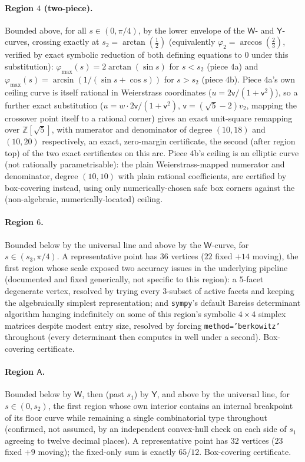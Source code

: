 \documentclass[11pt,reqno]{amsart}
\renewcommand{\_}{\origunderscore\allowbreak}
\numberwithin{equation}{section}
\theoremstyle{plain}
\theoremstyle{definition}
\theoremstyle{remark}
\newcommand{\tilt}{\varphi}                  %
\newcommand{\arcp}{s}                        %
\newcommand{\base}{u}                        %
\begin{document}
\paragraph{Region $4$ (two-piece).}\label{sec:region-4} Bounded above,
for all $\arcp\in(0,\pi/4)$, by the lower envelope of the $\mathsf W$-
and $\mathsf Y$-curves, crossing exactly at
$\arcp_2=\arctan(\tfrac12)$ (equivalently $\tilt_2=\arccos(\tfrac23)$,
verified by exact symbolic reduction of both defining equations to $0$
under this substitution): $\tilt_{\max}(\arcp)=2\arctan(\sin\arcp)$ for
$\arcp<\arcp_2$ (piece $4$a) and
$\tilt_{\max}(\arcp)=\arcsin(1/(\sin\arcp+\cos\arcp))$ for
$\arcp>\arcp_2$ (piece $4$b). Piece $4$a's own ceiling curve is itself
rational in Weierstrass coordinates ($\base=2\mathsf v/(1+\mathsf v^2)$),
so a further exact substitution ($\base=w\cdot2\mathsf v/(1+\mathsf v^2)$,
$\mathsf v=(\sqrt5-2)v_2$, mapping the crossover point itself to a
rational corner) gives an exact unit-square remapping over
$\mathbb{Z}[\sqrt5]$, with numerator and denominator of degree $(10,18)$
and $(10,20)$ respectively, an exact, zero-margin certificate, the
second (after region top) of the two exact certificates on this arc.
Piece $4$b's ceiling is an elliptic curve (not rationally
parametrisable): the plain Weierstrass-mapped numerator and denominator,
degree $(10,10)$ with plain rational coefficients, are certified by
box-covering instead, using only numerically-chosen safe box corners
against the (non-algebraic, numerically-located) ceiling.

\paragraph{Region $6$.} Bounded below by the universal line and above
by the $\mathsf W$-curve, for $\arcp\in(\arcp_3,\pi/4)$. A
representative point has $36$ vertices ($22$ fixed $+14$ moving), the
first region whose scale exposed two accuracy issues in the
underlying pipeline (documented and fixed generically, not specific to
this region): a $5$-facet degenerate vertex, resolved by trying every
$3$-subset of active facets and keeping the algebraically simplest
representation; and \texttt{sympy}'s default Bareiss determinant
algorithm hanging indefinitely on some of this region's symbolic
$4\times4$ simplex matrices despite modest entry size, resolved by
forcing \texttt{method='berkowitz'} throughout (every determinant then
computes in well under a second). Box-covering certificate.

\paragraph{Region $\mathsf A$.} Bounded below by $\mathsf W$, then (past
$\arcp_1$) by $\mathsf Y$, and above by the universal line, for
$\arcp\in(0,\arcp_2)$, the first region whose own interior contains
an internal breakpoint of its floor curve while remaining a single
combinatorial type throughout (confirmed, not assumed, by an
independent convex-hull check on each side of $\arcp_1$ agreeing to
twelve decimal places). A representative point has $32$ vertices ($23$
fixed $+9$ moving); the fixed-only sum is exactly $65/12$. Box-covering
certificate.
\end{document}
